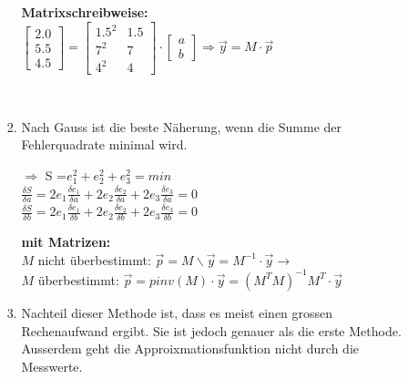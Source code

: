 \begin{enumerate}
\begin{enumerate}
\begin{enumerate}
\begin{minipage}{6cm}
					\textbf{Matrixschreibweise:}\\
						$\left[\begin{matrix}
						2.0 \\5.5\\ 4.5
						\end{matrix}\right] =
						\left[\begin{matrix}
						1.5^2 & 1.5 \\ 7^2 & 7\\ 4^2 & 4
						\end{matrix}\right] \cdot
						\left[\begin{matrix}
						a \\ b
						\end{matrix}\right] \Rightarrow
						\vec{y} = M \cdot \vec{p}$
				\end{minipage}\\           		
           		\item Nach Gauss ist die beste Näherung, wenn die Summe der
           		Fehlerquadrate minimal wird. \\
           		\begin{minipage}{8cm}
           			$\Longrightarrow$ S =$ e_1^2+e_2^2+e_3^2=min$\\
           			$\frac{\delta S}{\delta a}=
           			2 e_1 \frac{\delta e_1}{\delta a}+
           			2 e_2 \frac{\delta e_2}{\delta a}+
           			2 e_3 \frac{\delta e_3}{\delta a}=0$\\
           			$\frac{\delta S}{\delta b}=
           			2 e_1 \frac{\delta e_1}{\delta b}+
           			2 e_2 \frac{\delta e_2}{\delta b}+
           			2 e_3 \frac{\delta e_3}{\delta b}=0$\\
           		\end{minipage}
				\begin{minipage}{9cm}
					\textbf{mit Matrizen:}\\
						$M$ nicht überbestimmt: $\vec{p} = M\backslash\vec{y} = M^{-1} \cdot \vec{y} \rightarrow$ \\
						$M$ überbestimmt: $\vec{p} = pinv(M)\cdot \vec{y} = (M^TM)^{-1}M^T \cdot \vec{y}$\\
				\end{minipage}           		
           		\item Nachteil dieser Methode ist, dass es meist einen grossen
           		Rechenaufwand ergibt. Sie ist jedoch genauer als die erste Methode.
           		Ausserdem geht die Approixmationsfunktion nicht durch die Messwerte.
           		\end{enumerate}
		\end{enumerate}
	\end{enumerate}
	
